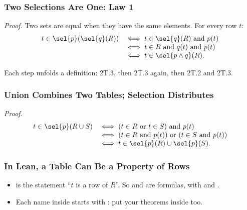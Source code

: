 \documentclass{ltx-talk}
\begin{document}
\begin{frame}
  \frametitle{Two Selections Are One: Law 1}
  \emph{Proof.} Two sets are equal when they have the same elements. For
  every row $t$:
  \[
    \begin{array}{@{}r@{\quad}l@{}}
      t \in \sel{p}(\sel{q}(R)) & \iff t \in \sel{q}(R) \text{ and }
        p(t) \\
      & \iff t \in R \text{ and } q(t) \text{ and } p(t) \\
      & \iff t \in \sel{p \wedge q}(R). \\
    \end{array}
  \]
  \proofend\par
  Each step unfolds a definition: 2T.3, then 2T.3 again, then 2T.2 and
  2T.3.
\end{frame}

\begin{frame}
  \frametitle{Union Combines Two Tables; Selection Distributes}
  \emph{Proof.}
  \[
    \begin{array}{@{}r@{\quad}l@{}}
      t \in \sel{p}(R \cup S) & \iff (t \in R \text{ or } t \in S)
        \text{ and } p(t) \\
      & \iff (t \in R \text{ and } p(t)) \text{ or } (t \in S
        \text{ and } p(t)) \\
      & \iff t \in \sel{p}(R) \cup \sel{p}(S). \\
    \end{array}
  \]
  \proofend
\end{frame}


\begin{frame*}
  \frametitle{In Lean, a Table Can Be a Property of Rows}
  \begin{itemize}
    \item {} is the statement ``$t$ is a row of $R$''. So
       and  are formulas, with  and
      .
    \item Each name inside  starts with :
      put your theorems inside too.
  \end{itemize}
\end{frame*}
\end{document}
